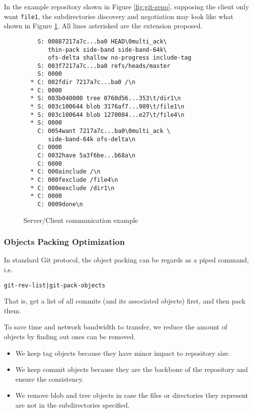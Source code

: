 \documentclass[preprint]{sigplanconf}
\begin{document}
In the example repository shown in Figure \ref{fig:git-repo}, supposing the
client only want \verb|file1|, the subdirectories discovery and negotiation may
look like what shown in Figure \ref{fig:c/s-comm}.
All lines asterisked are the extension proposed.

\begin{figure}[htpb]
  \centering
  \begin{verbatim}
    S: 00887217a7c...ba0 HEAD\0multi_ack\
       thin-pack side-band side-band-64k\
       ofs-delta shallow no-progress include-tag
    S: 003f7217a7c...ba0 refs/heads/master
    S: 0000
  * C: 002fdir 7217a7c...ba0 /\n
  * C: 0000
  * S: 003b040000 tree 0760d56...353\t/dir1\n
  * S: 003c100644 blob 3176af7...989\t/file1\n
  * S: 003c100644 blob 1270084...e27\t/file4\n
  * S: 0000
    C: 0054want 7217a7c...ba0\0multi_ack \
       side-band-64k ofs-delta\n
    C: 0000
    C: 0032have 5a3f6be...b68a\n
    C: 0000
  * C: 000ainclude /\n
  * C: 000fexclude /file4\n
  * C: 000eexclude /dir1\n
  * C: 0000
    C: 0009done\n
  \end{verbatim}
  \caption{Server/Client communication example}
  \label{fig:c/s-comm}
\end{figure}

\subsubsection{Objects Packing Optimization}
In standard Git protocol, the object packing can be regards as a piped command,
i.e.
\begin{verbatim}
git-rev-list|git-pack-objects
\end{verbatim}
That is, get a list of all commits (and its associated objects) first, and then
pack them.

To save time and network bandwidth to transfer, we reduce the amount of objects
by finding out ones can be removed.
\begin{itemize}
  \item We keep tag objects because they have minor impact to repository size.

  \item We keep commit objects because they are the backbone of the repository
    and ensure the consistency.

  \item We remove blob and tree objects in case the files or directories they
    represent are not in the subdirectories specified.

\end{itemize}
\end{document}
